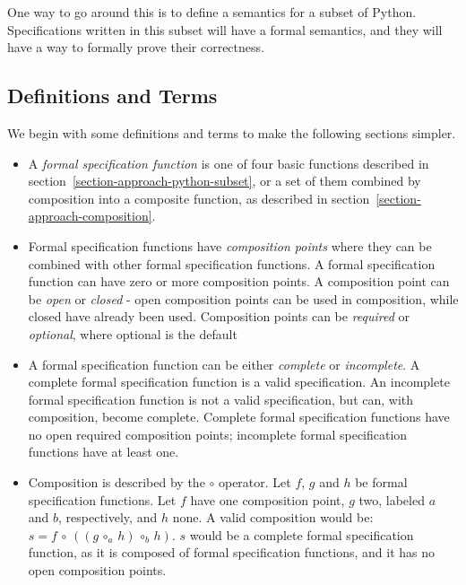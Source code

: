 \documentclass[a4paper,11pt]{kth-mag}
\begin{document}
One way to go around this is to define a semantics for a subset of Python.
Specifications written in this subset will have a formal semantics, and they
will have a way to formally prove their correctness.


\subsection{Definitions and Terms}

We begin with some definitions and terms to make the following sections
simpler.

\begin{itemize}
  \item A \textit{formal specification function} is one of four basic
    functions described in section~\ref{section-approach-python-subset}, or a
    set of them combined by composition into a composite function, as described
    in section~\ref{section-approach-composition}.

  \item Formal specification functions have \textit{composition points} where
    they can be combined with other formal specification functions. A formal
    specification function can have zero or more composition points. A
    composition point can be \textit{open} or \textit{closed} - open
    composition points can be used in composition, while closed have already
    been used. Composition points can be \textit{required} or
    \textit{optional}, where optional is the default

  \item A formal specification function can be either \textit{complete} or
    \textit{incomplete}. A complete formal specification function is a valid
    specification. An incomplete formal specification function is not a valid
    specification, but can, with composition, become complete. Complete formal
    specification functions have no open required composition points;
    incomplete formal specification functions have at least one.

  \item Composition is described by the $\circ$ operator. Let $f$, $g$ and $h$
    be formal specification functions. Let $f$ have one composition point, $g$
    two, labeled $a$ and $b$, respectively, and $h$ none. A valid composition
    would be: $s = f \, \circ \, ((g \, \circ_{a} \, h) \, \circ_{b} \, h)$.
    $s$ would be a complete formal specification function, as it is composed of
    formal specification functions, and it has no open composition points.
\end{itemize}
\end{document}
